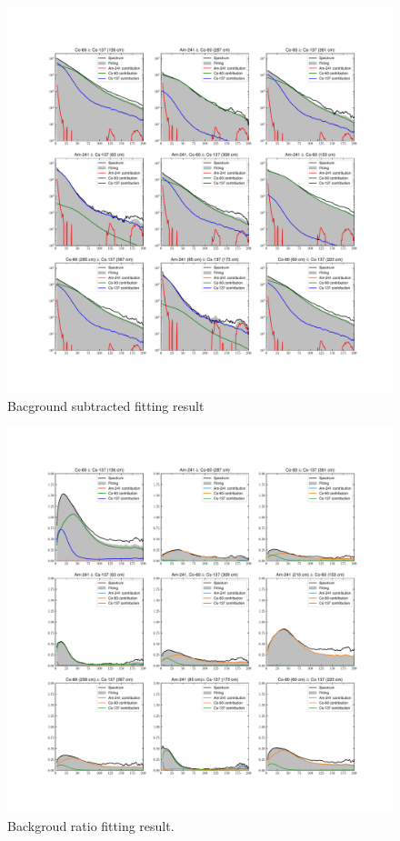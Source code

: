\documentclass[10pt]{wlscirep}
\begin{document}
\begin{figure}[ht]
\centering
\includegraphics[width=\linewidth]{figure/fit_BGSub.pdf}
\caption{Bacground subtracted fitting result}
\label{fig:fi_fitbgsub}
\end{figure}

\begin{figure}[ht]
\centering
\includegraphics[width=\linewidth]{figure/fit_BGRto.pdf}
\caption{Backgroud ratio fitting result.}
\label{fig:fi_fitbfrto}
\end{figure}
\end{document}
